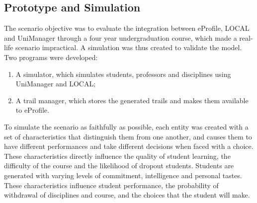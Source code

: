 \documentclass[preprint,authoryear,12pt,dvipdfm]{elsarticle}
\begin{document}



\subsection{Prototype and Simulation}
\label{sec:simulacao_cen1}

The scenario objective was to evaluate the integration between eProfile, LOCAL and UniManager through a four year undergraduation course, which made a real-life scenario impractical. A simulation was thus created to validate the model. Two programs were developed:

\begin{enumerate}
  \item A simulator, which simulates students, professors and disciplines using UniManager and LOCAL;
  \item A trail manager, which stores the generated trails and makes them available to eProfile.
\end{enumerate}

To simulate the scenario as faithfully as possible, each entity was created with a set of characteristics that distinguish them from one another, and causes them to have different performances and take different decisions when faced with a choice. These characteristics directly influence the quality of student learning, the difficulty of the course and the likelihood of dropout students. Students are generated with varying levels of commitment, intelligence and personal tastes. These characteristics influence student performance, the probability of withdrawal of disciplines and course, and the choices that the student will make.
\end{document}

